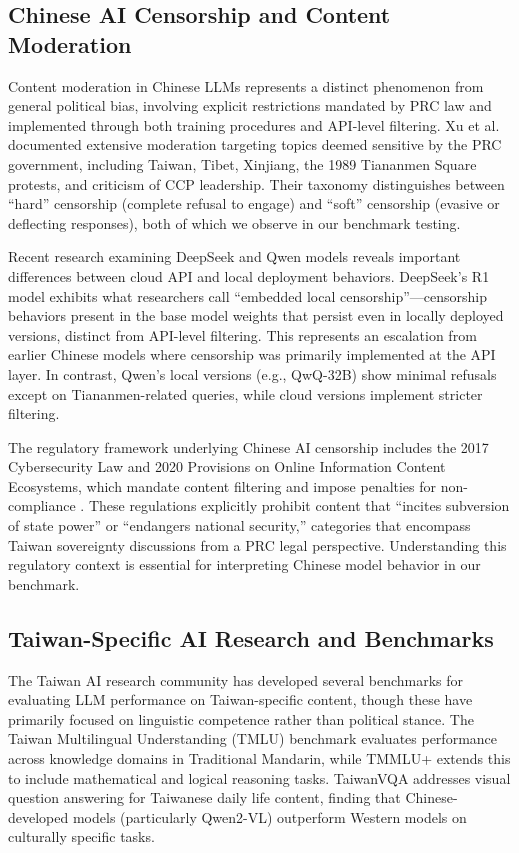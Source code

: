 \documentclass[11pt,a4paper]{article}
\begin{document}
\subsection{Chinese AI Censorship and Content Moderation}

Content moderation in Chinese LLMs represents a distinct phenomenon from general political bias, involving explicit restrictions mandated by PRC law and implemented through both training procedures and API-level filtering. Xu et al. \citep{xu2024censorship} documented extensive moderation targeting topics deemed sensitive by the PRC government, including Taiwan, Tibet, Xinjiang, the 1989 Tiananmen Square protests, and criticism of CCP leadership. Their taxonomy distinguishes between ``hard'' censorship (complete refusal to engage) and ``soft'' censorship (evasive or deflecting responses), both of which we observe in our benchmark testing.

Recent research examining DeepSeek and Qwen models reveals important differences between cloud API and local deployment behaviors. DeepSeek's R1 model exhibits what researchers call ``embedded local censorship''---censorship behaviors present in the base model weights that persist even in locally deployed versions, distinct from API-level filtering. This represents an escalation from earlier Chinese models where censorship was primarily implemented at the API layer. In contrast, Qwen's local versions (e.g., QwQ-32B) show minimal refusals except on Tiananmen-related queries, while cloud versions implement stricter filtering.

The regulatory framework underlying Chinese AI censorship includes the 2017 Cybersecurity Law and 2020 Provisions on Online Information Content Ecosystems, which mandate content filtering and impose penalties for non-compliance \citep{china2020provisions}. These regulations explicitly prohibit content that ``incites subversion of state power'' or ``endangers national security,'' categories that encompass Taiwan sovereignty discussions from a PRC legal perspective. Understanding this regulatory context is essential for interpreting Chinese model behavior in our benchmark.

\subsection{Taiwan-Specific AI Research and Benchmarks}

The Taiwan AI research community has developed several benchmarks for evaluating LLM performance on Taiwan-specific content, though these have primarily focused on linguistic competence rather than political stance. The Taiwan Multilingual Understanding (TMLU) benchmark \citep{tmlu2024} evaluates performance across knowledge domains in Traditional Mandarin, while TMMLU+ extends this to include mathematical and logical reasoning tasks. TaiwanVQA \citep{taiwanvqa2024} addresses visual question answering for Taiwanese daily life content, finding that Chinese-developed models (particularly Qwen2-VL) outperform Western models on culturally specific tasks.
\end{document}
